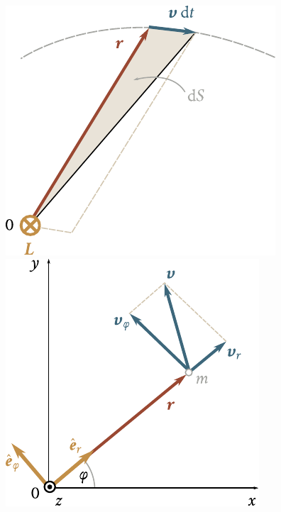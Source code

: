 \begin{figure}[!htb]
	\begin{minipage}[t]{0.5\linewidth}
		\begin{center}
			\includegraphics[scale=0.95]{figures/ch_03/fig_3_26.pdf}
			\caption[]{}
			\label{fig:3_26}
		\end{center}
	\end{minipage}
	\hspace{-0.05cm}
	\begin{minipage}[t]{0.5\linewidth}
		\begin{center}
			\includegraphics[scale=0.95]{figures/ch_03/fig_3_27.pdf}
			\caption[]{}
			\label{fig:3_27}
		\end{center}
	\end{minipage}
\end{figure}

